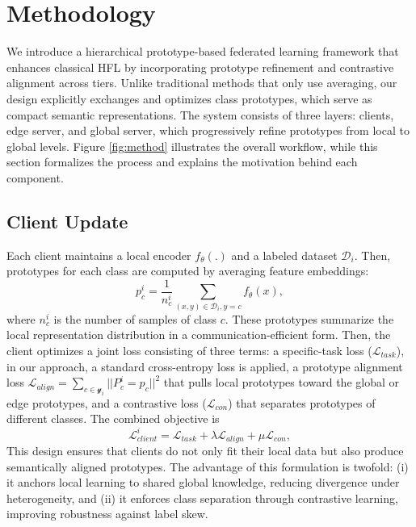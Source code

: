 \documentclass[twoside]{article}
\begin{document}
\section{Methodology}
\label{sec:methodology}
    We introduce a hierarchical prototype-based federated learning framework that enhances classical HFL by incorporating prototype refinement and contrastive alignment across tiers. Unlike traditional methods that only use averaging, our design explicitly exchanges and optimizes class prototypes, which serve as compact semantic representations. The system consists of three layers: clients, edge server, and global server, which progressively refine prototypes from local to global levels. Figure \ref{fig:method} illustrates the overall workflow, while this section formalizes the process and explains the motivation behind each component.

    \subsection{Client Update}
        Each client maintains a local encoder $f_{\theta} (.)$ and a labeled dataset $\mathcal{D}_i$. Then, prototypes for each class are computed by averaging feature embeddings:
            \begin{equation}
                p_c^i=\frac{1}{n_c^i} \sum_{(x,y) \in \mathcal{D}_i, y = c} f_{\theta}(x),
            \end{equation}
        where $n_c^i$ is the number of samples of class $c$. These prototypes summarize the local representation distribution in a communication-efficient form. Then, the client optimizes a joint loss consisting of three terms: a specific-task loss ($\mathcal{L}_{task}$), in our approach, a standard cross-entropy loss is applied, a prototype alignment loss $\mathcal{L}_{align}= \sum_{c\in \mathcal{y}_i} ||P_c^i =p_c||^2$ that pulls local prototypes toward the global or edge prototypes, and a contrastive loss ($\mathcal{L}_{con}$) that separates prototypes of different classes. The combined objective is
            \begin{equation}
                \mathcal{L}_{client}^i = \mathcal{L}_{task} + \lambda \mathcal{L}_{align} + \mu \mathcal{L}_{con},
            \end{equation}
        This design ensures that clients do not only fit their local data but also produce semantically aligned prototypes. The advantage of this formulation is twofold: (i) it anchors local learning to shared global knowledge, reducing divergence under heterogeneity, and (ii) it enforces class separation through contrastive learning, improving robustness against label skew.
\end{document}
